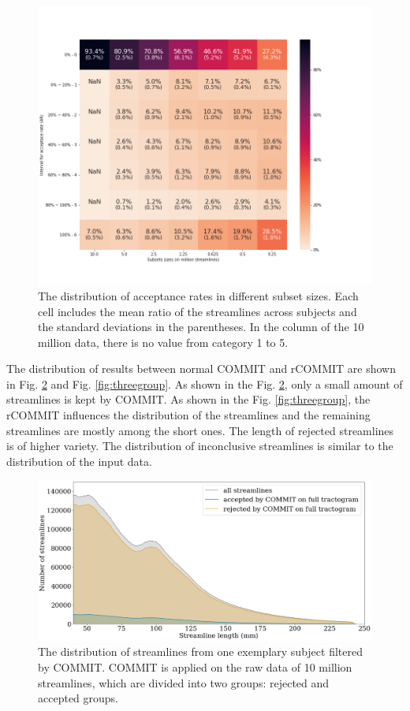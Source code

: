 \begin{figure}[ht]
    \centering
    \includegraphics[width= 12cm]{figures/heatmap_new.png}
        \caption{The distribution of acceptance rates in different subset sizes. Each cell includes the mean ratio of 
        the streamlines across subjects and the standard deviations in the parentheses. In the column of the 10 million data, there is no value from category 1 to 5.
        }
    \label{fig:heatmap}
\end{figure}

The distribution of results between normal COMMIT and rCOMMIT are shown in Fig. \ref{fig:ori_distri} and Fig. \ref{fig:threegroup}.
As shown in the Fig. \ref{fig:ori_distri}, only a small amount of streamlines is kept by COMMIT. As shown in the Fig. \ref{fig:threegroup}, the rCOMMIT influences the distribution of the streamlines and the remaining 
streamlines are mostly among the short ones. The length of rejected streamlines is of higher variety. The distribution of inconclusive streamlines
is similar to the distribution of the input data.

\begin{figure}[ht]
    \centering
    \includegraphics[width= 12cm]{figures/distributon_origi.png}
        \caption{The distribution of streamlines from one exemplary subject filtered by COMMIT. COMMIT is applied on the raw data of 10 million streamlines, which are 
        divided into two groups: rejected and accepted groups.}
    \label{fig:ori_distri}
\end{figure}

